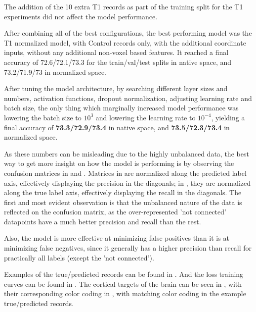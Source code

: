 The addition of the 10 extra T1 records as part of the training split for the T1 experiments did not affect the model performance.\par
After combining all of the best configurations, the best performing model was the T1 normalized model, with Control records only, with the additional coordinate inputs, without any additional non-voxel based features. It reached a final accuracy of 72.6/72.1/73.3 for the train/val/test splits in native space, and 73.2/71.9/73 in normalized space.\par
After tuning the model architecture, by searching different layer sizes and numbers, activation functions, dropout normalization, adjusting learning rate and batch size, the only thing which marginally increased model performance was lowering the batch size to $10^3$ and lowering the learning rate to $10^{-4}$, yielding a final accuracy of \textbf{73.3/72.9/73.4} in native space, and \textbf{73.5/72.3/73.4} in normalized space.\par
As these numbers can be misleading due to the highly unbalanced data, the best way to get more insight on how the model is performing is by observing the confusion matrices in  and . Matrices in  are normalized along the predicted label axis, effectively displaying the precision in the diagonals; in , they are normalized along the true label axis, effectively displaying the recall in the diagonals. The first and most evident observation is that the unbalanced nature of the data is reflected on the confusion matrix, as the over-represented 'not connected' datapoints have a much better precision and recall than the rest.\par
Also, the model is more effective at minimizing false positives than it is at minimizing false negatives, since it generally has a higher precision than recall for practically all labels (except the 'not connected').\par
Examples of the true/predicted records can be found in  . And the loss training curves can be found in . The cortical targets of the brain can be seen in , with their corresponding color coding in , with matching color coding in the example true/predicted records.

